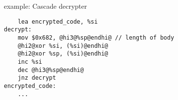 
\begin{frame}[fragile,label=cascade]{example: Cascade decrypter}
\begin{lstlisting}
    lea encrypted_code, %si
decrypt:
    mov $0x682, @hi3@%sp@endhi@ // length of body
    @hi2@xor %si, (%si)@endhi@
    @hi2@xor %sp, (%si)@endhi@
    inc %si
    dec @hi3@%sp@endhi@
    jnz decrypt
encrypted_code:
    ...
\end{lstlisting}
\end{frame}


